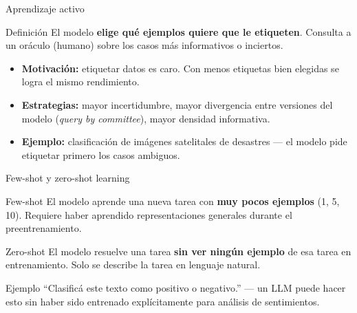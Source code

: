\documentclass[aspectratio=169]{beamer}
\begin{document}
\begin{frame}{Aprendizaje activo}
  \begin{block}{Definición}
    El modelo \textbf{elige qué ejemplos quiere que le etiqueten}. Consulta a un oráculo (humano) sobre los casos más informativos o inciertos.
  \end{block}
  \bigskip
  \begin{itemize}
    \item \textbf{Motivación:} etiquetar datos es caro. Con menos etiquetas bien elegidas se logra el mismo rendimiento.
    \item \textbf{Estrategias:} mayor incertidumbre, mayor divergencia entre versiones del modelo (\textit{query by committee}), mayor densidad informativa.
    \item \textbf{Ejemplo:} clasificación de imágenes satelitales de desastres — el modelo pide etiquetar primero los casos ambiguos.
  \end{itemize}
\end{frame}

\begin{frame}{Few-shot y zero-shot learning}
  \begin{block}{Few-shot}
    El modelo aprende una nueva tarea con \textbf{muy pocos ejemplos} (1, 5, 10). Requiere haber aprendido representaciones generales durante el preentrenamiento.
  \end{block}
  \begin{block}{Zero-shot}
    El modelo resuelve una tarea \textbf{sin ver ningún ejemplo} de esa tarea en entrenamiento. Solo se describe la tarea en lenguaje natural.
  \end{block}
  \bigskip
  \begin{exampleblock}{Ejemplo}
    ``Clasificá este texto como positivo o negativo.'' --- un LLM puede hacer esto sin haber sido entrenado explícitamente para análisis de sentimientos.
  \end{exampleblock}
\end{frame}
\end{document}
